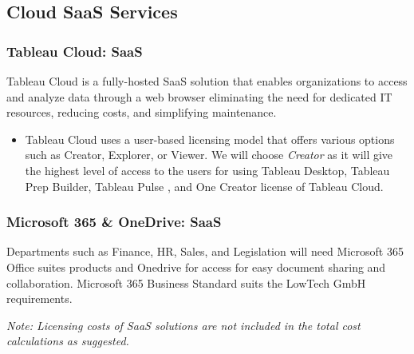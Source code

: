 \documentclass{llncs}
\begin{document}
\subsection{Cloud SaaS Services}

\subsubsection{Tableau Cloud: SaaS} \leavevmode\newline
Tableau Cloud is a fully-hosted SaaS
solution that enables organizations to access and analyze data through a web browser eliminating the need for dedicated IT resources, reducing costs, and simplifying maintenance.
\begin{itemize}
    \item Tableau Cloud uses a user-based licensing model that offers various options such as Creator, Explorer, or Viewer. We will choose \textit{Creator} as it will give the highest level of access to the users for using Tableau Desktop, Tableau Prep Builder, Tableau Pulse
          , and One Creator license of Tableau Cloud.
\end{itemize}

\subsubsection{Microsoft 365 \& OneDrive: SaaS} \leavevmode\newline
Departments such as Finance, HR, Sales, and Legislation will need Microsoft 365 Office suites products and Onedrive for access for easy document sharing
and collaboration. Microsoft 365 Business Standard suits the LowTech GmbH requirements.

\textit{Note: Licensing costs of SaaS solutions are not included in the total cost calculations as suggested.}
\end{document}
